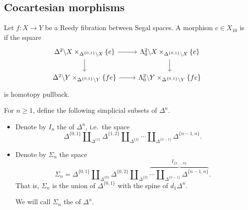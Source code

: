 \documentclass[main.tex]{subfiles}
\begin{document}
\subsection{Cocartesian morphisms}
\label{ssc:cocartesian_morphisms}

\begin{definition}
  Let $f\colon X \to Y$ be a Reedy fibration between Segal spaces. A morphism $e \in X_{10}$ is  if the square
  \begin{equation*}
    \begin{tikzcd}
      \Delta^{2} \backslash X \times_{\Delta^{\{0, 1\}} \backslash X} \{e\}
      \arrow[r]
      \arrow[d]
      & \Lambda^{2}_{0} \backslash X \times_{\Delta^{\{0, 1\}} \backslash X} \{e\}
      \arrow[d]
      \\
      \Delta^{2} \backslash Y \times_{\Delta^{\{0, 1\}} \backslash Y} \{fe\}
      \arrow[r]
      & \Lambda^{2}_{0} \backslash Y \times_{\Delta^{\{0, 1\}} \backslash Y} \{fe\}
    \end{tikzcd}
  \end{equation*}
  is homotopy pullback.
\end{definition}

\begin{definition}
  For $n \geq 1$, define the following simplicial subsets of $\Delta^{n}$.

  \begin{itemize}
    \item Denote by $I_{n}$ the  of $\Delta^{n}$, i.e.\ the space
      \begin{equation*}
        \Delta^{\{0, 1\}} \amalg_{\Delta^{\{1\}}} \Delta^{\{1, 2\}} \amalg_{\Delta^{\{2\}}} \cdots \amalg_{\Delta^{\{n-1\}}} \Delta^{\{n-1, n\}}.
      \end{equation*}

    \item Denote by $\Sigma_{n}$ the space
      \begin{equation*}
        \Sigma_{n} = \Delta^{\{0, 1\}} \amalg_{\Delta^{\{0\}}} \Delta^{\{0, 2\}} \amalg_{\Delta^{\{2\}}} \overbrace{\cdots \amalg_{\Delta^{\{n-1\}}} \Delta^{\{n-1, n\}}}^{I_{\{2, \ldots, n\}}} .
      \end{equation*}
      That is, $\Sigma_{n}$ is the union of $\Delta^{\{0, 1\}}$ with the spine of $d_{1}\Delta^{n}$.

      We will call $\Sigma_{n}$ the  of $\Delta^{n}$.
  \end{itemize}
\end{definition}
\end{document}

